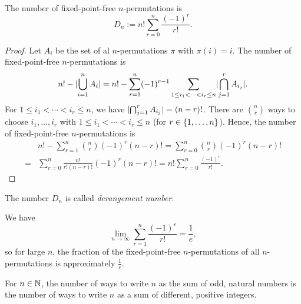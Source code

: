 \documentclass[language=english]{../../Template/TemplateLecture}
\begin{document}
\begin{prop}
    The number of fixed-point-free $n$-permutations is 
    \begin{equation}
        D_n := n! \sum_{r = 0}^{n} \frac{(-1)^r}{r!}.
    \end{equation}
\end{prop}
\begin{proof}
    Let $A_i$ be the set of al $n$-permutations $\pi$ with $\pi(i) = i$. The number of fixed-point-free $n$-permutations is 
    \begin{equation}
        n! - \lvert\bigcup_{i = 1}^n A_i\rvert = n! - \sum_{r = 1}^n (-1)^{r-1} \sum_{1 \leq i_1 < \cdots < i_r \leq n} \lvert\bigcap_{j = 1}^r A_{i_j}\rvert.
    \end{equation}
    For $1 \leq i_1 <  \cdots < i_r \leq n$, we have $\lvert\bigcap_{j = 1}^r A_{i_j}\rvert = (n-r)!$. There are $\binom{n}{r}$ ways to choose $i_1, \ldots, i_r$ with $1 \leq i_1 < \cdots < i_r \leq n$ (for $r \in \{1,\ldots,n\}$). Hence, the number of fixed-point-free $n$-permutations is 
    \begin{equation}
        \begin{split}
             &n! - \sum_{r = 1}^n \binom{n}{r} (-1)^r (n-r)! = \sum_{r = 0}^n \binom{n}{r} (-1)^r (n-r)!\\
            =& \sum_{r = 0}^n \frac{n!}{r!(n-r)!} (-1)^r (n-r)! = n!\sum_{r = 0}^n \frac{(-1)^r}{r!}.
        \end{split}
    \end{equation}
\end{proof}
The number $D_n$ is called \emph{derangement number}.

\begin{bemerkung}
    We have 
    \begin{equation}
        \lim_{n \to \infty} \sum_{r = 1}^n \frac{(-1)^r}{r!} = \frac{1}{e},
    \end{equation}
    so for large $n$, the fraction of the fixed-point-free $n$-permutations of all $n$-permutations is approximately $\frac{1}{e}$.
\end{bemerkung}

\begin{prop}
    For $n \in \mathbb{N}$, the number of ways to write $n$ as the sum of odd, natural numbers is the number of ways to write $n$ as a sum of different, positive integers.
\end{prop}
\end{document}
